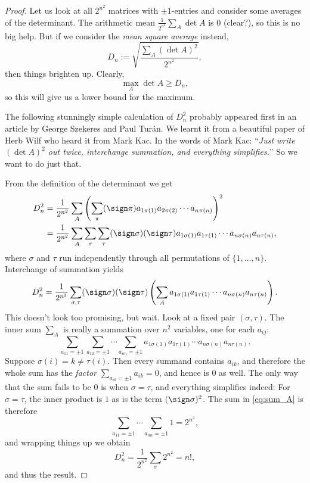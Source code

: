 \begin{proof}
  Let us look at all $2^{n^2}$ matrices with $\pm 1$-entries and consider some averages of the determinant.
  The arithmetic mean $\frac{1}{2^{n^2}} \sum_A \det A$ is $0$ (clear?), so this is no big help.
  But if we consider the \emph{mean square average} instead,
  \[
  D_n := \sqrt{\frac{\sum_A (\det A)^2}{2^{n^2}}},
  \]
  then things brighten up.
  Clearly,
  \[
  \max_A \det A \ge D_n,
  \]
  so this will give us a lower bound for the maximum.

  The following stunningly simple calculation of $D_n^2$ probably appeared first in an article by George Szekeres and Paul Tur\'an.
  We learnt it from a beautiful paper of Herb Wilf who heard it from Mark Kac.
  In the words of Mark Kac:
  ``\emph{Just write $(\det A)^2$ out twice, interchange summation, and everything simplifies.}''
  So we want to do just that.

  From the definition of the determinant we get
  \begin{align*}
  D_n^2 &= \frac{1}{2^{n^2}} \sum_A \left( \sum_{\pi} (\sign \pi) a_{1\pi(1)} a_{2\pi(2)} \cdots a_{n\pi(n)} \right)^2 \\
  &= \frac{1}{2^{n^2}} \sum_A \sum_{\sigma} \sum_{\tau} (\sign \sigma) (\sign \tau) a_{1\sigma(1)} a_{1\tau(1)} \cdots a_{n\sigma(n)} a_{n\tau(n)},
  \end{align*}
  where $\sigma$ and $\tau$ run independently through all permutations of $\{1, \dots, n\}$.
  Interchange of summation yields
  \[
  D_n^2 = \frac{1}{2^{n^2}} \sum_{\sigma, \tau} (\sign \sigma) (\sign \tau) \left(\sum_A a_{1\sigma(1)} a_{1\tau(1)} \cdots a_{n\sigma(n)} a_{n\tau(n)}\right).
  \]
  This doesn't look too promising, but wait.
  Look at a fixed pair $(\sigma, \tau)$.
  The inner sum $\sum_A$ is really a summation over $n^2$ variables, one for each $a_{ij}$:
  \begin{equation} \label{eq:sum_A}
  \sum_{a_{11} = \pm 1} \sum_{a_{12} = \pm 1} \cdots \sum_{a_{nn} = \pm 1} a_{1\sigma(1)} a_{1\tau(1)} \cdots a_{n\sigma(n)} a_{n\tau(n)}.
  \end{equation}
  Suppose $\sigma(i) = k \ne \tau(i)$.
  Then every summand contains $a_{ik}$, and therefore the whole sum has the \emph{factor} $\sum_{a_{ik} = \pm 1} a_{ik} = 0$,
  and hence is $0$ as well.
  The only way that the sum fails to be $0$ is when $\sigma = \tau$, and everything simplifies indeed:
  For $\sigma = \tau$, the inner product is $1$ as is the term $(\sign \sigma)^2$.
  The sum in \eqref{eq:sum_A} is therefore
  \[
  \sum_{a_{11} = \pm 1} \cdots \sum_{a_{nn} = \pm 1} 1 = 2^{n^2},
  \]
  and wrapping things up we obtain
  \[
  D_n^2 = \frac{1}{2^{n^2}} \sum_{\sigma} 2^{n^2} = n!,
  \]
  and thus the result.
\end{proof}


